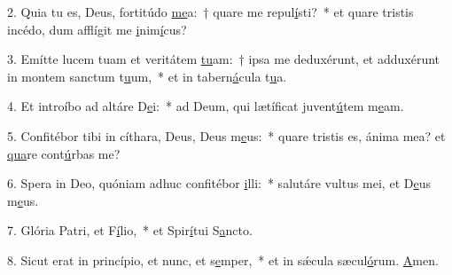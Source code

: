 2. Quia tu es, Deus, fortitúdo \uline{me}a:~† quare me repul\uline{í}sti?~* et quare tristis incédo, dum afflígit me \uline{i}nim\uline{í}cus?\par 
3. Emítte lucem tuam et veritátem \uline{tu}am:~† ipsa me deduxérunt, et adduxérunt in montem sanctum t\uline{u}um,~* et in tabern\uline{á}cula t\uline{u}a.\par 
4. Et introíbo ad altáre D\uline{e}i:~* ad Deum, qui lætíficat juvent\uline{ú}tem m\uline{e}am.\par 
5. Confitébor tibi in cíthara, Deus, Deus m\uline{e}us:~* quare tristis es, ánima mea? et \uline{qua}re cont\uline{ú}rbas me?\par 
6. Spera in Deo, quóniam adhuc confitébor \uline{i}lli:~* salutáre vultus mei, et D\uline{e}us m\uline{e}us.\par 
7. Glória Patri, et F\uline{í}lio,~* et Spir\uline{í}tui S\uline{a}ncto.\par 
8. Sicut erat in princípio, et nunc, et s\uline{e}mper,~* et in sǽcula sæcul\uline{ó}rum. \uline{A}men.\par 
